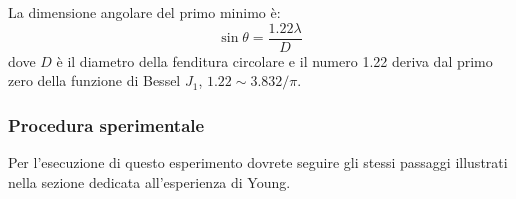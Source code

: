 \documentclass[a4paper,10pt,oneside]{article}
\begin{document}
La dimensione angolare del primo minimo è:
\begin{equation}
 \sin\theta=\frac{1.22\lambda}{D}
\end{equation}
dove $D$ è il diametro della fenditura circolare e il numero 1.22 deriva dal primo zero della funzione di Bessel $J_1$, $1.22\sim 3.832/\pi$.


\subsubsection*{Procedura sperimentale}
Per l'esecuzione di questo esperimento dovrete seguire gli stessi passaggi illustrati nella sezione dedicata all'esperienza di Young.
\end{document}
